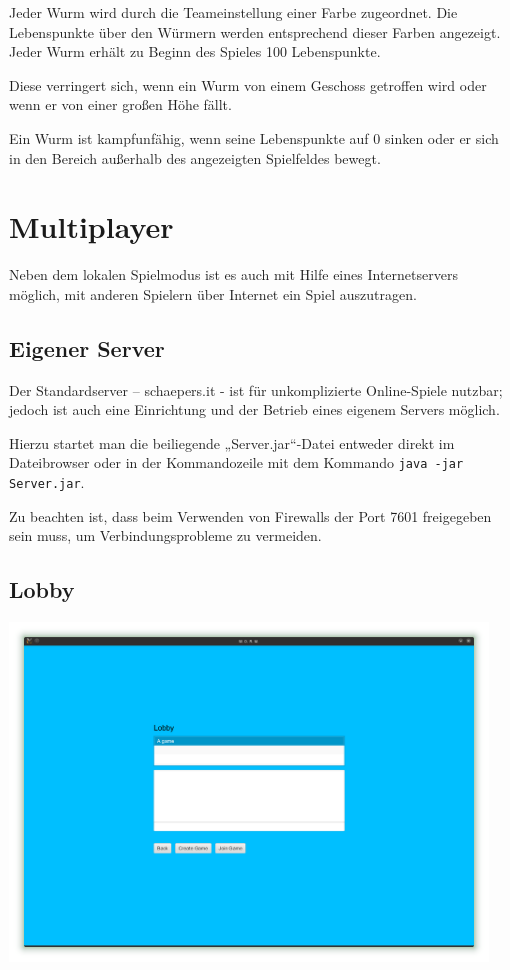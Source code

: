 \documentclass{scrreprt}
\begin{document}
Jeder Wurm wird durch die Teameinstellung einer Farbe zugeordnet. Die Lebenspunkte über den Würmern werden entsprechend dieser Farben angezeigt.
Jeder Wurm erhält zu Beginn des Spieles 100 Lebenspunkte.

Diese verringert sich, wenn ein Wurm von einem Geschoss getroffen wird oder wenn er von einer großen Höhe fällt.

Ein Wurm ist kampfunfähig, wenn seine Lebenspunkte auf 0 sinken oder er sich in den Bereich außerhalb des angezeigten Spielfeldes bewegt.

\chapter{Multiplayer}

Neben dem lokalen Spielmodus ist es auch mit Hilfe eines Internetservers möglich, mit anderen Spielern über Internet ein Spiel auszutragen.

\section{Eigener Server}

Der Standardserver – schaepers.it - ist für unkomplizierte Online-Spiele nutzbar; jedoch ist auch eine Einrichtung und der Betrieb eines
eigenem Servers möglich.

Hierzu startet man die beiliegende „Server.jar“-Datei entweder direkt im Dateibrowser oder in der Kommandozeile mit dem Kommando
\texttt{java -jar Server.jar}.

Zu beachten ist, dass beim Verwenden von Firewalls der  Port 7601 freigegeben sein muss, um Verbindungsprobleme zu vermeiden.

\section{Lobby}

\includegraphics[height=9cm]{Screenshot8.png}
\end{document}

